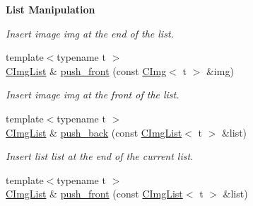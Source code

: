 \begin{Indent}{\bf List Manipulation}
\begin{DoxyCompactItemize}
\begin{DoxyCompactList}\small\item\em Insert image {\ttfamily img} at the end of the list. \item\end{DoxyCompactList}\item 
\hypertarget{structcimg__library_1_1_c_img_list_abf862f4e91637ae01b97ea6e06dda678}{
{\footnotesize template$<$typename t $>$ }\\\hyperlink{structcimg__library_1_1_c_img_list}{CImgList} \& \hyperlink{structcimg__library_1_1_c_img_list_abf862f4e91637ae01b97ea6e06dda678}{push\_\-front} (const \hyperlink{structcimg__library_1_1_c_img}{CImg}$<$ t $>$ \&img)}
\label{structcimg__library_1_1_c_img_list_abf862f4e91637ae01b97ea6e06dda678}

\begin{DoxyCompactList}\small\item\em Insert image {\ttfamily img} at the front of the list. \item\end{DoxyCompactList}\item 
\hypertarget{structcimg__library_1_1_c_img_list_a77f990bd2e68f75b795e39c2fadeb5ea}{
{\footnotesize template$<$typename t $>$ }\\\hyperlink{structcimg__library_1_1_c_img_list}{CImgList} \& \hyperlink{structcimg__library_1_1_c_img_list_a77f990bd2e68f75b795e39c2fadeb5ea}{push\_\-back} (const \hyperlink{structcimg__library_1_1_c_img_list}{CImgList}$<$ t $>$ \&list)}
\label{structcimg__library_1_1_c_img_list_a77f990bd2e68f75b795e39c2fadeb5ea}

\begin{DoxyCompactList}\small\item\em Insert list {\ttfamily list} at the end of the current list. \item\end{DoxyCompactList}\item 
\hypertarget{structcimg__library_1_1_c_img_list_a23886b535cc9394e703f5865e90b1cf0}{
{\footnotesize template$<$typename t $>$ }\\\hyperlink{structcimg__library_1_1_c_img_list}{CImgList} \& \hyperlink{structcimg__library_1_1_c_img_list_a23886b535cc9394e703f5865e90b1cf0}{push\_\-front} (const \hyperlink{structcimg__library_1_1_c_img_list}{CImgList}$<$ t $>$ \&list)}
\label{structcimg__library_1_1_c_img_list_a23886b535cc9394e703f5865e90b1cf0}


\end{DoxyCompactItemize}
\end{Indent}
